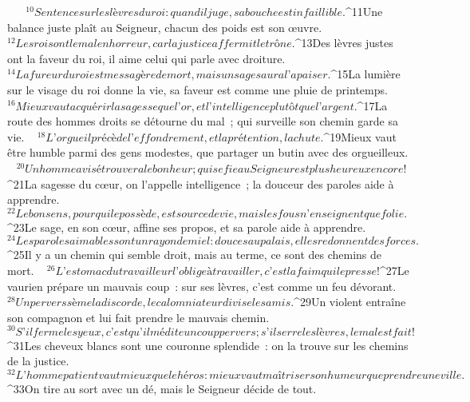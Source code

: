            
       
${}^{10}Sentence sur les lèvres du roi :
        quand il juge, sa bouche est infaillible.
         
${}^{11}Une balance juste plaît au Seigneur,
        chacun des poids est son œuvre.
         
${}^{12}Les rois ont le mal en horreur,
        car la justice affermit le trône.
         
${}^{13}Des lèvres justes ont la faveur du roi,
        il aime celui qui parle avec droiture.
         
${}^{14}La fureur du roi est messagère de mort,
        mais un sage saura l’apaiser.
         
${}^{15}La lumière sur le visage du roi donne la vie,
        sa faveur est comme une pluie de printemps.
         
${}^{16}Mieux vaut acquérir la sagesse que l’or,
        et l’intelligence plutôt que l’argent.
         
${}^{17}La route des hommes droits se détourne du mal ;
        qui surveille son chemin garde sa vie.
         
${}^{18}L’orgueil précède l’effondrement,
        et la prétention, la chute.
         
${}^{19}Mieux vaut être humble parmi des gens modestes,
        que partager un butin avec des orgueilleux.
         
${}^{20}Un homme avisé trouvera le bonheur ;
        qui se fie au Seigneur est plus heureux encore !
         
${}^{21}La sagesse du cœur, on l’appelle intelligence ;
        la douceur des paroles aide à apprendre.
         
${}^{22}Le bon sens, pour qui le possède, est source de vie,
        mais les fous n’enseignent que folie.
         
${}^{23}Le sage, en son cœur, affine ses propos,
        et sa parole aide à apprendre.
         
${}^{24}Les paroles aimables sont un rayon de miel :
        douces au palais, elles redonnent des forces.
         
${}^{25}Il y a un chemin qui semble droit,
        mais au terme, ce sont des chemins de mort.
         
${}^{26}L’estomac du travailleur l’oblige à travailler,
        c’est la faim qui le presse !
         
${}^{27}Le vaurien prépare un mauvais coup :
        sur ses lèvres, c’est comme un feu dévorant.
         
${}^{28}Un pervers sème la discorde,
        le calomniateur divise les amis.
         
${}^{29}Un violent entraîne son compagnon
        et lui fait prendre le mauvais chemin.
         
${}^{30}S’il ferme les yeux, c’est qu’il médite un coup pervers ;
        s’il serre les lèvres, le mal est fait !
         
${}^{31}Les cheveux blancs sont une couronne splendide :
        on la trouve sur les chemins de la justice.
         
${}^{32}L’homme patient vaut mieux que le héros :
        mieux vaut maîtriser son humeur que prendre une ville.
         
${}^{33}On tire au sort avec un dé,
        mais le Seigneur décide de tout.
       
      
